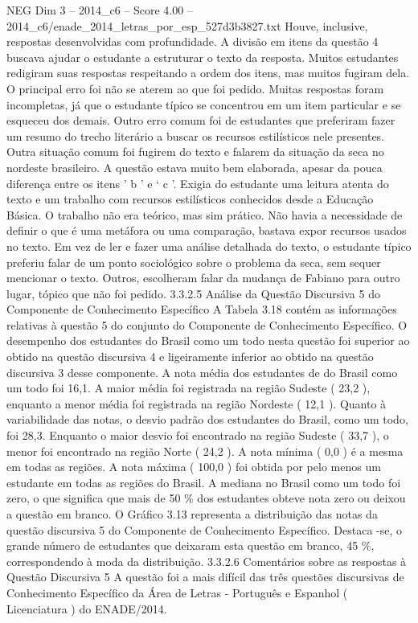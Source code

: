 \begin{textsample}{NEG Dim 3 – 2014\_c6 – Score 4.00 – 2014\_c6/enade\_2014\_letras\_por\_esp\_527d3b3827.txt}
Houve, inclusive, respostas desenvolvidas com profundidade.
A divisão em itens da questão 4 buscava ajudar o estudante a estruturar o texto da resposta.
Muitos estudantes redigiram suas respostas respeitando a ordem dos itens, mas muitos fugiram dela.
O principal erro foi não se aterem ao que foi pedido.
Muitas respostas foram incompletas, já que o estudante típico se concentrou em um item particular e se esqueceu dos demais.
Outro erro comum foi de estudantes que preferiram fazer um resumo do trecho literário a buscar os recursos estilísticos nele presentes.
Outra situação comum foi fugirem do texto e falarem da situação da seca no nordeste brasileiro.
A questão estava muito bem elaborada, apesar da pouca diferença entre os itens ’ b ’ e ‘ c ’.
Exigia do estudante uma leitura atenta do texto e um trabalho com recursos estilísticos conhecidos desde a Educação Básica.
O trabalho não era teórico, mas sim prático.
Não havia a necessidade de definir o que é uma metáfora ou uma comparação, bastava expor recursos usados no texto.
Em vez de ler e fazer uma análise detalhada do texto, o estudante típico preferiu falar de um ponto sociológico sobre o problema da seca, sem sequer mencionar o texto.
Outros, escolheram falar da mudança de Fabiano para outro lugar, tópico que não foi pedido. 3.3.2.5 Análise da Questão Discursiva 5 do Componente de Conhecimento Específico A Tabela 3.18 contém as informações relativas à questão 5 do conjunto do Componente de Conhecimento Específico.
O desempenho dos estudantes do Brasil como um todo nesta questão foi superior ao obtido na questão discursiva 4 e ligeiramente inferior ao obtido na questão discursiva 3 desse componente.
A nota média dos estudantes de do Brasil como um todo foi 16,1.
A maior média foi registrada na região Sudeste ( 23,2 ), enquanto a menor média foi registrada na região Nordeste ( 12,1 ).
Quanto à variabilidade das notas, o desvio padrão dos estudantes do Brasil, como um todo, foi 28,3.
Enquanto o maior desvio foi encontrado na região Sudeste ( 33,7 ), o menor foi encontrado na região Norte ( 24,2 ).
A nota mínima ( 0,0 ) é a mesma em todas as regiões.
A nota máxima ( 100,0 ) foi obtida por pelo menos um estudante em todas as regiões do Brasil.
A mediana no Brasil como um todo foi zero, o que significa que mais de 50 \% dos estudantes obteve nota zero ou deixou a questão em branco.
O Gráfico 3.13 representa a distribuição das notas da questão discursiva 5 do Componente de Conhecimento Específico.
Destaca -se, o grande número de estudantes que deixaram esta questão em branco, 45 \%, correspondendo à moda da distribuição. 3.3.2.6 Comentários sobre as respostas à Questão Discursiva 5 A questão foi a mais difícil das três questões discursivas de Conhecimento Específico da Área de Letras - Português e Espanhol ( Licenciatura ) do ENADE/2014.

\end{textsample}
